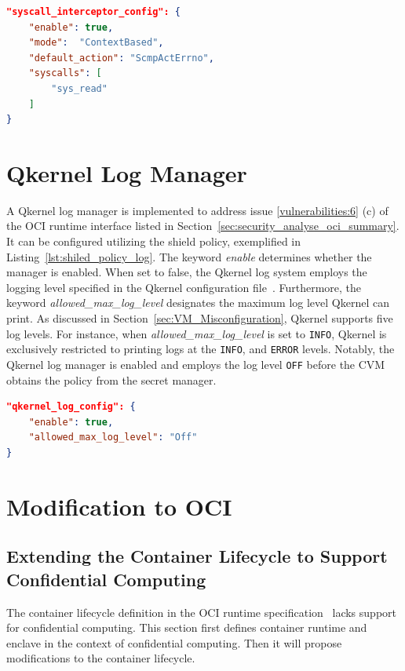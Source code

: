 \begin{lstlisting}[language=json, caption= System call interceptor's configuration in the shield policy, label={lst:shiled_policy_interceptor}]
"syscall_interceptor_config": {
    "enable": true,
    "mode":  "ContextBased",
    "default_action": "ScmpActErrno",
    "syscalls": [
        "sys_read"
    ]
}
\end{lstlisting}

\section{Qkernel Log Manager}
\label{sec:Qkernel_logger}
A Qkernel log manager is implemented to address issue \ref{vulnerabilities:6} (c) of the OCI runtime interface listed in Section~\ref{sec:security_analyse_oci_summary}. It can be configured utilizing the shield policy, exemplified in Listing~\ref{lst:shiled_policy_log}. The keyword \emph{enable} determines whether the manager is enabled. When set to false, the Qkernel log system employs the logging level specified in 
the Qkernel configuration file~\cite*{quark_conf_file}. Furthermore, the keyword \emph{allowed\_max\_log\_level} designates the maximum log level Qkernel can print. As discussed in Section~\ref{sec:VM_Misconfiguration}, Qkernel supports five log levels. For instance, when \emph{allowed\_max\_log\_level} is set to \texttt{INFO}, Qkernel is exclusively 
restricted to printing logs at the \texttt{INFO}, and \texttt{ERROR} levels. Notably, the Qkernel log manager is enabled and employs the log level \texttt{OFF} before the \acrshort{CVM} obtains the policy from the secret manager.

\begin{lstlisting}[language=json, caption= Qkernel log manager's configuration in the shield policy, label={lst:shiled_policy_log}]
"qkernel_log_config": {
    "enable": true,
    "allowed_max_log_level": "Off"
}
\end{lstlisting}
    

\section{Modification to OCI}
\label{sec:Modification_OCI}

\subsection{Extending the Container Lifecycle to Support Confidential Computing}
The container lifecycle definition in the OCI runtime specification~\cite*{oci-runtime-spec} lacks support for confidential computing. This section first defines container runtime and enclave in the context of confidential computing. Then it will propose modifications to the container 
lifecycle.


